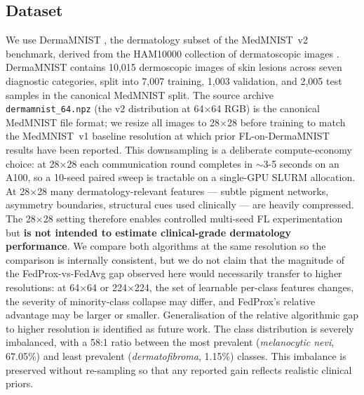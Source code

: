 \documentclass[11pt,a4paper]{article}
\begin{document}
\subsection{Dataset}\label{sec:dataset}
We use DermaMNIST \citep{yang2023medmnistv2}, the dermatology subset of the
MedMNIST~v2 benchmark, derived from the HAM10000 collection of
dermatoscopic images \citep{tschandl2018ham10000}. DermaMNIST contains 10{,}015
dermoscopic images of skin lesions across seven diagnostic categories,
split into 7{,}007 training, 1{,}003 validation, and 2{,}005 test samples in
the canonical MedMNIST split. The source archive \texttt{dermamnist\_64.npz} (the v2 distribution at
64$\times$64 RGB) is the canonical MedMNIST file format; we resize all
images to 28$\times$28 before training to match the MedMNIST~v1 baseline
resolution at which prior FL-on-DermaMNIST results have been reported.
This downsampling is a deliberate compute-economy choice: at 28$\times$28
each communication round completes in $\sim$3-5 seconds on an A100, so a
10-seed paired sweep is tractable on a single-GPU SLURM allocation.
At 28$\times$28 many dermatology-relevant features --- subtle pigment
networks, asymmetry boundaries, structural cues used clinically --- are
heavily compressed. The 28$\times$28 setting therefore enables controlled
multi-seed FL experimentation but \textbf{is not intended to estimate
clinical-grade dermatology performance}. We compare both algorithms at
the same resolution so the comparison is internally consistent, but we
do not claim that the magnitude of the FedProx-vs-FedAvg gap observed
here would necessarily transfer to higher resolutions: at 64$\times$64
or 224$\times$224, the set of learnable per-class features changes, the
severity of minority-class collapse may differ, and FedProx's relative
advantage may be larger or smaller. Generalisation of the relative
algorithmic gap to higher resolution is identified as future work. The class distribution
is severely imbalanced, with a 58:1 ratio between the most prevalent
(\textit{melanocytic nevi}, 67.05\%) and least prevalent
(\textit{dermatofibroma}, 1.15\%) classes. This imbalance is preserved without
re-sampling so that any reported gain reflects realistic clinical priors.
\end{document}
